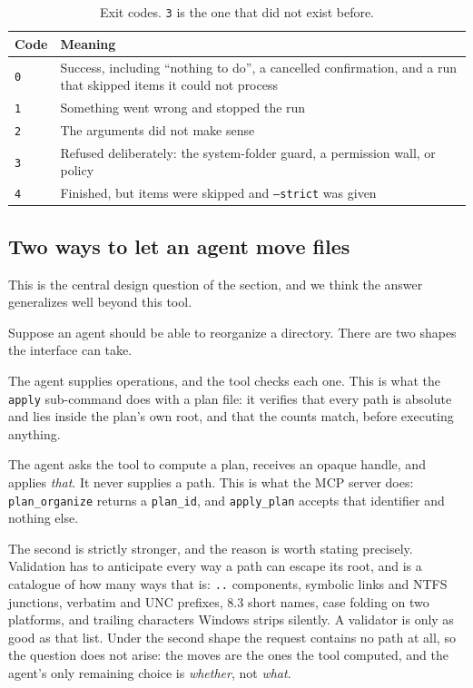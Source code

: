 \documentclass[11pt,a4paper]{article}
\newcommand{\code}[1]{\texttt{\small #1}}
\begin{document}
\begin{table}[t]
\centering
\small
\caption{Exit codes. \code{3} is the one that did not exist before.}
\label{tab:exits}
\begin{tabularx}{\textwidth}{@{}l X@{}}
\toprule
\textbf{Code} & \textbf{Meaning} \\
\midrule
\code{0} & Success, including \enquote{nothing to do}, a cancelled confirmation, and a run that skipped items it could not process \\
\code{1} & Something went wrong and stopped the run \\
\code{2} & The arguments did not make sense \\
\code{3} & Refused deliberately: the system-folder guard, a permission wall, or policy \\
\code{4} & Finished, but items were skipped and \code{--strict} was given \\
\bottomrule
\end{tabularx}
\end{table}

\subsection{Two ways to let an agent move files}
\label{sec:agent:capability}

This is the central design question of the section, and we think the answer
generalizes well beyond this tool.

Suppose an agent should be able to reorganize a directory. There are two
shapes the interface can take.

\begin{description}[leftmargin=1.6em,itemsep=0.3em]
  \item[Validate what it asks for.] The agent supplies operations, and the tool
    checks each one. This is what the \code{apply} sub-command does with a plan
    file: it verifies that every path is absolute and lies inside the plan's own
    root, and that the counts match, before executing anything.
  \item[Never let it name anything.] The agent asks the tool to compute a plan,
    receives an opaque handle, and applies \emph{that}. It never supplies a
    path. This is what the MCP server does: \code{plan\_organize} returns a
    \code{plan\_id}, and \code{apply\_plan} accepts that identifier and nothing
    else.
\end{description}

The second is strictly stronger, and the reason is worth stating precisely.
Validation has to anticipate every way a path can escape its root, and
 is a catalogue of how many ways that is: \code{..}
components, symbolic links and NTFS junctions, verbatim and UNC prefixes, 8.3
short names, case folding on two platforms, and trailing characters Windows
strips silently. A validator is only as good as that list. Under the second
shape the request contains no path at all, so the question does not arise: the
moves are the ones the tool computed, and the agent's only remaining choice is
\emph{whether}, not \emph{what}.
\end{document}
